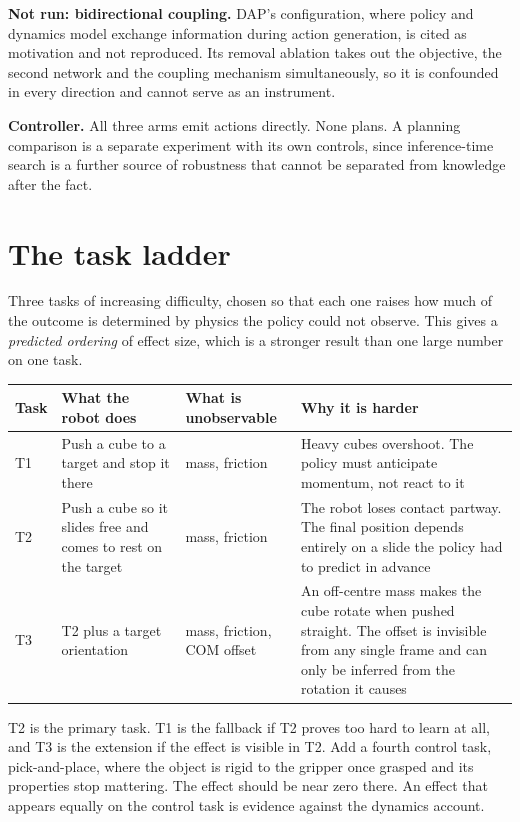 \documentclass[9pt]{extarticle}
\begin{document}
\textbf{Not run: bidirectional coupling.} DAP's configuration, where policy and dynamics model exchange information during action generation, is cited as motivation and not reproduced. Its removal ablation takes out the objective, the second network and the coupling mechanism simultaneously, so it is confounded in every direction and cannot serve as an instrument.

\textbf{Controller.} All three arms emit actions directly. None plans. A planning comparison is a separate experiment with its own controls, since inference-time search is a further source of robustness that cannot be separated from knowledge after the fact.

\section{The task ladder}

Three tasks of increasing difficulty, chosen so that each one raises how much of the outcome is determined by physics the policy could not observe. This gives a \emph{predicted ordering} of effect size, which is a stronger result than one large number on one task.

\begin{tabular}{@{}p{1.1cm} p{5.4cm} p{4.6cm} p{5.1cm}@{}}
\toprule
Task & What the robot does & What is unobservable & Why it is harder \\
\midrule
T1 & Push a cube to a target and stop it there & mass, friction & Heavy cubes overshoot. The policy must anticipate momentum, not react to it \\
T2 & Push a cube so it slides free and comes to rest on the target & mass, friction & The robot loses contact partway. The final position depends entirely on a slide the policy had to predict in advance \\
T3 & T2 plus a target orientation & mass, friction, COM offset & An off-centre mass makes the cube rotate when pushed straight. The offset is invisible from any single frame and can only be inferred from the rotation it causes \\
\bottomrule
\end{tabular}

T2 is the primary task. T1 is the fallback if T2 proves too hard to learn at all, and T3 is the extension if the effect is visible in T2. Add a fourth control task, pick-and-place, where the object is rigid to the gripper once grasped and its properties stop mattering. The effect should be near zero there. An effect that appears equally on the control task is evidence against the dynamics account.
\end{document}
